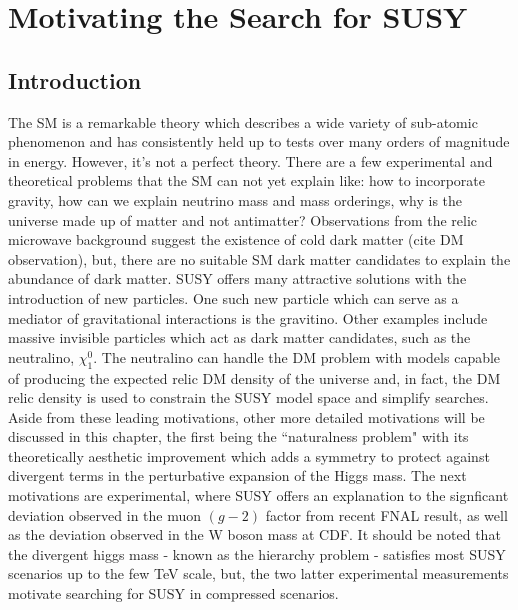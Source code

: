 
\setcounter{secnumdepth}{3}
\setcounter{tocdepth}{3}

\setlength{\parindent}{1 em}


\makeatother


\chapter{Motivating the Search for SUSY}


\section{Introduction}

The SM is a remarkable theory which describes a wide variety of sub-atomic phenomenon and has consistently held up to tests over many orders of magnitude in energy. However, it's not a perfect theory. There are a few  experimental and theoretical problems that the SM can not yet explain like: how to incorporate gravity,  how can we explain neutrino mass and mass orderings, why is the universe made up of matter and not antimatter?   Observations from the relic microwave background suggest the existence of cold dark matter (cite DM observation), but, there are no suitable SM dark matter candidates to explain the abundance of dark matter. SUSY offers many attractive solutions with the introduction of new particles. One such new particle which can serve as a mediator of gravitational interactions is the gravitino. Other examples include  massive invisible particles which act as dark matter candidates, such as the neutralino, $\chi_1^0$. The neutralino can handle the DM problem with models capable of producing the expected relic DM density of the universe and, in fact, the DM relic density is used to constrain the SUSY model space and simplify searches. Aside from these leading motivations, other more detailed motivations will be discussed in this chapter, the first being the ``naturalness problem" with its theoretically aesthetic improvement which adds a symmetry to protect against divergent terms in the perturbative expansion of the Higgs mass. The next motivations are experimental, where SUSY offers an explanation to the signficant deviation observed in the muon $(g-2)$ factor from recent FNAL result, as well as the deviation observed in the W boson mass at CDF. It should be noted that the divergent higgs mass - known as the hierarchy problem - satisfies most SUSY scenarios up to the few TeV scale, but, the two latter experimental measurements motivate searching for SUSY in compressed scenarios.




